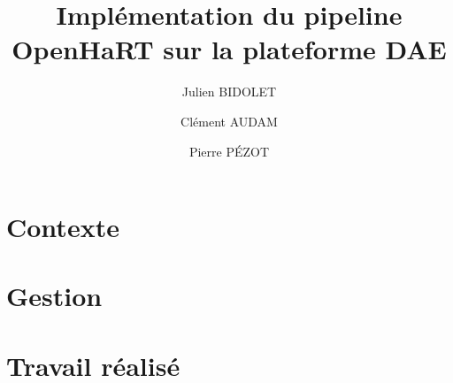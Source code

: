 \documentclass[c]{beamer}
\title[Soutenance de Projet Industriel]{Implémentation du pipeline OpenHaRT sur la plateforme DAE}
\author{Julien BIDOLET \and Clément AUDAM \and Pierre P\'EZOT }
\institute{TELECOM Nancy}
\begin{document}
\begin{frame}
  \maketitle
\end{frame}

\begin{frame}
  \tableofcontents
\end{frame}
\section{Contexte}
\section{Gestion}
		    

\section{Travail réalisé}
\end{document}

